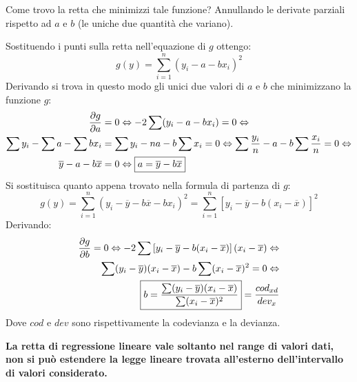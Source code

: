 \documentclass[a4paper, 15pt]{article}
\begin{document}
\begin{adjustwidth}{2in}{}
	Come trovo la retta che minimizzi tale funzione? Annullando le derivate parziali rispetto ad $a$ e $b$ (le uniche due quantità che variano).
	
	Sostituendo i punti sulla retta nell'equazione di $g$ ottengo: 
	\[g(y) = \sum_{i=1}^{n}(y_i-a-bx_i)^2\]
	Derivando si trova in questo modo gli unici due valori di $a$ e $b$ che minimizzano la funzione $g$: 
	\[ \begin{aligned}
		{\partial g\over \partial a} & = 0 \Leftrightarrow -2\sum(y_i - a - bx_i) = 0 \Leftrightarrow \\
		\sum y_i - \sum a - \sum bx_i & = \sum y_i - na - b\sum x_i = 0 \Leftrightarrow \sum {y_i\over n} - a - b\sum {x_i\over n} = 0 \Leftrightarrow \\
		\overline{y} - a - b\overline{x} & = 0 \Leftrightarrow \boxed{a = \overline{y} - b\overline{x}}
	\end{aligned}\]
	Si sostituisca quanto appena trovato nella formula di partenza di $g$:
	\[g(y) = \sum_{i=1}^{n} (y_i-\overline{y} - b\overline{x}-bx_i)^2 = \sum_{i=1}^{n}\left[y_i - \overline{y} - b(x_i - \overline{x})\right]^2\]
	Derivando:
	\begin{eqnarray*}
		{\partial g\over \partial b}  = 0 \Leftrightarrow -2\sum\left[y_i - \overline{y} - b(x_i - \overline{x})\right](x_i - \overline{x}) \Leftrightarrow \\
		\sum(y_i - \overline{y})(x_i - \overline{x}) - b\sum(x_i-\overline{x})^2  = 0 \Leftrightarrow \\
		\boxed{b = \dfrac{	\sum(y_i - \overline{y})(x_i - \overline{x})}{\sum(x_i-\overline{x})^2}} = {cod_{xd}\over dev_x}
	\end{eqnarray*}
	Dove $cod$ e $dev$ sono rispettivamente la codevianza e la devianza. \newline 
	
	\begin{center}
		\textbf{La retta di regressione lineare vale soltanto nel range di valori dati, non si può estendere la legge lineare trovata all'esterno dell'intervallo di valori considerato.}
	\end{center}
\end{adjustwidth}
\end{document}
